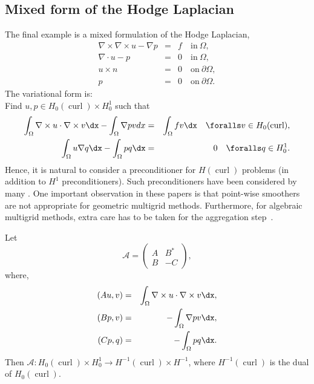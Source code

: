 \subsection{Mixed form of the Hodge Laplacian}
The final example is a mixed formulation
of the Hodge Laplacian,
\begin{eqnarray}
\nabla \times \nabla \times u - \nabla p &=& f \quad \mbox{in} \ \Omega,    \label{mixed:hodge1} \\
\nabla \cdot u -p &=&  0 \quad \mbox{in} \ \Omega, \label{mixed:hodge2} \\
             u \times n &=&  0 \quad \mbox{on} \ \partial \Omega, \\
             p          &=&  0 \quad \mbox{on} \ \partial \Omega.
\end{eqnarray}
The variational form is: \\
Find $u, p \in H_0(\operatorname{curl}) \times H^1_0$ such that
\begin{eqnarray}
\int_\Omega \nabla \times u \cdot \nabla \times v \dx
- \int_\Omega \nabla p v dx  &=& \int_\Omega f v \dx  \quad \foralls v \in H_0(\operatorname{curl}), \\
 \int_\Omega u  \nabla q \dx - \int_\Omega p q \dx   &=& 0 \quad
 \foralls q \in H^1_0 .
\end{eqnarray}
Hence, it is natural to consider a preconditioner  for
$H(\operatorname{curl})$ problems (in addition to $H^1$
preconditioners). Such preconditioners have been considered by many
\citep{ArnoldFalkWinther1997a,ArnoldFalkWinther2000,Hiptmair1997,Hiptmair1999}.
One important observation in these papers is that point-wise smoothers
are not appropriate for geometric multigrid methods. Furthermore, for
algebraic multigrid methods, extra care has to be taken for the
aggregation
step~\citep{GeeSiefertHuEtAl2006,HuTuminaroBochevEtAl2006}.

Let
\[
\mathcal{A}  =
\begin{pmatrix} A & B^* \\ B & -C \end{pmatrix},
\]
where,
\begin{eqnarray}
(A u, v) &=& \int_\Omega \nabla \times u \cdot \nabla \times v \dx, \\
(B p, v) &=&  - \int_\Omega \nabla p v \dx, \\
(C p, q) &=&  - \int_\Omega p q \dx.
\end{eqnarray}
Then $\mathcal{A}: H_0(\operatorname{curl}) \times H^1_0 \rightarrow
H^{-1}(\operatorname{curl}) \times H^{-1}$, where
$H^{-1}(\operatorname{curl})$ is the dual of
$H_0(\operatorname{curl})$.

